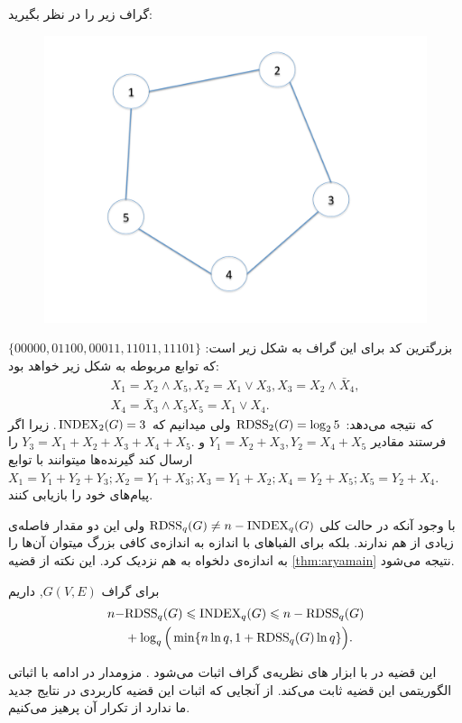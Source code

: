  \begin{example}
 	گراف زیر را در نظر بگیرید:
\begin{figure}[H]
	\centering
	\includegraphics[width=0.7\linewidth]{figs/chapter6/storage-graph-pent}
	\caption{}
	\label{fig:storage-graph-pent}
\end{figure}
بزرگترین کد برای این گراف به شکل زیر است:
$\{00000,01100,00011,11011,11101\}$
که توابع مربوطه به شکل زیر خواهد بود:
\begin{align*}
	X_1 = X_2 \wedge X_5, 
	X_2 = X_1 \vee X_3,
	X_3 = X_2 \wedge \bar{X}_4, \\
	X_4 = \bar{X}_3 \wedge X_5
	X_5 = X_1\vee X_4.
\end{align*}
که نتیجه می‌دهد:
$\mathrm{RDSS}_2(G) = \log_2 5$
ولی میدانیم که
$\mathrm{INDEX}_2(G)=3$.
زیرا اگر فرستند مقادیر
 $Y_1= X_2+X_3, Y_2= X_4+X_5$ 
 و
  $Y_3= X_1+X_2+X_3+X_4+X_5.$
  را ارسال کند گیرنده‌ها میتوانند با توابع
  $X_1 = Y_1 + Y_2+Y_3; X_2 = Y_1+X_3; X_3 = Y_1+X_2; X_4 = Y_2+X_5; X_5 = Y_2+X_4.$
  پیام‌های خود را بازیابی کنند.
 \end{example}
 
 با وجود آنکه در حالت کلی 
 $\mathrm{RDSS}_q(G) \ne n - \mathrm{INDEX}_q(G)$
 ولی این دو مقدار فاصله‌ی زیادی از هم ندارند. بلکه برای الفباهای با اندازه به اندازه‌ی کافی بزرگ میتوان آن‌ها را به اندازه‌ی دلخواه به هم نزدیک کرد. این نکته از قضیه 
 \ref{thm:aryamain}
 نتیجه می‌شود.
 \begin{theorem}\label{thm:aryamain}
 	برای گراف
 	 $G(V,E)$,
 	 داریم
 	\begin{align}
 		n - &\mathrm{RDSS}_q(G) \leqslant \mathrm{INDEX}_q(G) \leqslant n -\mathrm{RDSS}_q(G)\nonumber \\
 		&  + \log_q\Big(\min\{n\ln q, 1+ \mathrm{RDSS}_q(G)\ln q \}\Big). 
 	\end{align}
 \end{theorem}
 
 این قضیه در
 \cite{4691014}
 با ابزار های نظریه‌ی گراف اثبات می‌شود . مزومدار در ادامه با اثباتی الگوریتمی این قضیه ثابت می‌کند. از آنجایی که اثبات این قضیه کاربردی در نتایج جدید ما ندارد از تکرار آن پرهیز می‌کنیم.

